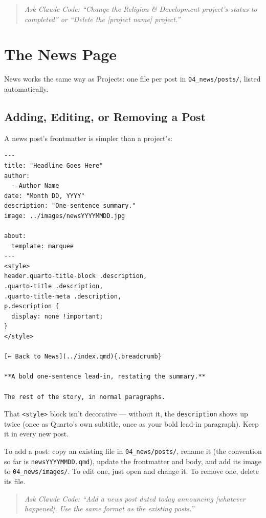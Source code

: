 \documentclass[11pt]{article}
\newcommand{\file}[1]{\texttt{#1}}
\newcommand{\cmd}[1]{\texttt{#1}}
\begin{document}
\begin{quote}
\textit{Ask Claude Code: ``Change the Religion \& Development project's
status to completed'' or ``Delete the [project name] project.''}
\end{quote}

\section{The News Page}
\label{sec:news-page}

News works the same way as Projects: one file per post in
\file{04\_news/posts/}, listed automatically.

\subsection{Adding, Editing, or Removing a Post}

A news post's frontmatter is simpler than a project's:

\begin{lstlisting}
---
title: "Headline Goes Here"
author:
  - Author Name
date: "Month DD, YYYY"
description: "One-sentence summary."
image: ../images/newsYYYYMMDD.jpg

about:
  template: marquee
---
<style>
header.quarto-title-block .description,
.quarto-title .description,
.quarto-title-meta .description,
p.description {
  display: none !important;
}
</style>

[← Back to News](../index.qmd){.breadcrumb}

**A bold one-sentence lead-in, restating the summary.**

The rest of the story, in normal paragraphs.
\end{lstlisting}

That \cmd{<style>} block isn't decorative --- without it, the
\file{description} shows up twice (once as Quarto's own subtitle, once
as your bold lead-in paragraph). Keep it in every new post.

To add a post: copy an existing file in \file{04\_news/posts/}, rename
it (the convention so far is \file{newsYYYYMMDD.qmd}), update the
frontmatter and body, and add its image to \file{04\_news/images/}. To
edit one, just open and change it. To remove one, delete its file.

\begin{quote}
\textit{Ask Claude Code: ``Add a news post dated today announcing
[whatever happened]. Use the same format as the existing posts.''}
\end{quote}
\end{document}
